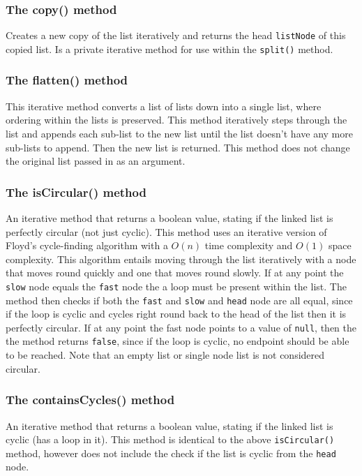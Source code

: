\documentclass{article}
\begin{document}
\subsubsection{The copy() method}
Creates a new copy of the list iteratively and returns the head \verb+listNode+ of this copied list. Is a private iterative method for use within the \verb+split()+ method.

\subsubsection{The flatten() method}
This iterative method converts a list of lists down into a single list, where ordering within the lists is preserved. This method iteratively steps through the list and appends each sub-list to the new list until the list doesn't have any more sub-lists to append. Then the new list is returned. This method does not change the original list passed in as an argument.

\subsubsection{The isCircular() method}
An iterative method that returns a boolean value, stating if the linked list is perfectly circular (not just cyclic). This method uses an iterative version of Floyd's cycle-finding algorithm with a $O(n)$ time complexity and $O(1)$ space complexity. This algorithm entails moving through the list iteratively with a node that moves round quickly and one that moves round slowly. If at any point the \verb+slow+ node equals the \verb+fast+ node the a loop must be present within the list. The method then checks if both the \verb+fast+ and \verb+slow+ and \verb+head+ node are all equal, since if the loop is cyclic and cycles right round back to the head of the list then it is perfectly circular. If at any point the fast node points to a value of \verb+null+, then the the method returns \verb+false+, since if the loop is cyclic, no endpoint should be able to be reached. Note that an empty list or single node list is not considered circular.

\subsubsection{The containsCycles() method}
An iterative method that returns a boolean value, stating if the linked list is cyclic (has a loop in it). This method is identical to the above \verb+isCircular()+ method, however does not include the check if the list is cyclic from the \verb+head+ node.
\end{document}
